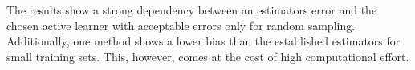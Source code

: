 The results show a strong dependency between an estimators error and the chosen active learner with acceptable errors only for random sampling. Additionally, one method shows a lower bias than the established estimators for small training sets. This, however, comes at the cost of high computational effort.